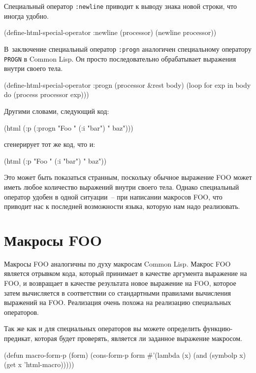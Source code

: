 Специальный оператор \lstinline{:newline} приводит к выводу знака новой строки, что иногда удобно.

\begin{myverb}
(define-html-special-operator :newline (processor)
  (newline processor))
\end{myverb}

В~заключение специальный оператор \lstinline{:progn} аналогичен специальному оператору
\lstinline{PROGN} в Common Lisp.  Он просто последовательно обрабатывает выражения внутри
свое\-го тела.

\begin{myverb}
(define-html-special-operator :progn (processor &rest body)
  (loop for exp in body do (process processor exp)))
\end{myverb}

Другими словами, следующий код:

\begin{myverb}
(html (:p (:progn "Foo " (:i "bar") " baz")))
\end{myverb}

\noindent{}сгенерирует тот же код, что и:

\begin{myverb}
(html (:p "Foo " (:i "bar") " baz"))
\end{myverb}

Это может быть показаться странным, поскольку обычное выражение FOO может иметь любое
количество выражений внутри своего тела.  Однако специальный оператор удобен в одной
ситуации~-- при написании макросов FOO, что приводит нас к последней возможности языка,
которую нам надо реализовать.

\section{Макросы FOO}

Макросы FOO аналогичны по духу макросам Common Lisp.  Макрос FOO является отрывком кода,
который принимает в качестве аргумента выражение на FOO, и возвращает в качестве
результата новое выражение на FOO, которое затем вычисляется в соответствии со
стандартными правилами вычисления выражений на FOO.  Реализация очень похожа на реализацию
специальных операторов.

Так же как и для специальных операторов вы можете определить функцию-предикат, которая
будет проверять, является ли заданное выражение макросом.

\begin{myverb}
(defun macro-form-p (form)
  (cons-form-p form #'(lambda (x) (and (symbolp x) (get x 'html-macro)))))
\end{myverb}

